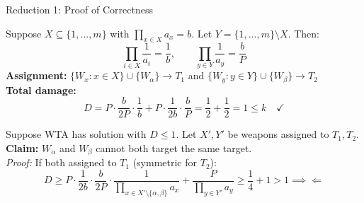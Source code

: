 \documentclass[aspectratio=169,10pt]{beamer}
\begin{document}
\begin{frame}{Reduction 1: Proof of Correctness}


  \vspace{0.15cm}
  {\footnotesize
  Suppose $X \subseteq \{1,\ldots,m\}$ with $\prod_{x \in X} a_x = b$. Let $Y = \{1,\ldots,m\} \setminus X$. Then:
  \[
    \prod_{i \in X} \frac{1}{a_i} = \frac{1}{b}, \qquad \prod_{y \in Y} \frac{1}{a_y} = \frac{b}{P}
  \]
  \textbf{Assignment:} $\{W_x : x \in X\} \cup \{W_\alpha\} \to T_1$ and $\{W_y : y \in Y\} \cup \{W_\beta\} \to T_2$\\
  \textbf{Total damage:}
  \[
    D = P \cdot \frac{b}{2P} \cdot \frac{1}{b} + P \cdot \frac{1}{2b} \cdot \frac{b}{P} = \frac{1}{2} + \frac{1}{2} = 1 \leq k \quad \checkmark
  \]
  }

  \vspace{0.2cm}


  \vspace{0.15cm}
  {\footnotesize
  Suppose WTA has solution with $D \leq 1$. Let $X', Y'$ be weapons assigned to $T_1, T_2$.\\
  \textbf{Claim:} $W_\alpha$ and $W_\beta$ cannot both target the same target.\\
  \textit{Proof:} If both assigned to $T_1$ (symmetric for $T_2$):
  \[
    D \geq P \cdot \frac{1}{2b} \cdot \frac{b}{2P} \cdot \frac{1}{\prod_{x \in X' \setminus \{\alpha,\beta\}} a_x}
    + \frac{P}{\prod_{y \in Y'} a_y} \geq \frac{1}{4} + 1 > 1 \implies\Leftarrow
  \]
  }

\end{frame}
\end{document}
